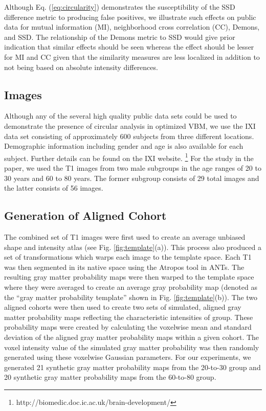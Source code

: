 \documentclass[]{spie}  %
\begin{document}
Although Eq. (\ref{eq:circularity}) demonstrates the susceptibility 
of the SSD difference metric to producing false positives, we illustrate such 
effects on public data for mutual information (MI), neighborhood cross
correlation (CC), Demons, and SSD.  The relationship of the Demons metric
to SSD would give prior indication that similar effects should 
be seen whereas the effect should be lesser for MI and CC given that the
similarity measures are less localized in addition to not being based on
absolute intensity differences.

\subsection{Images}

Although any of the several high quality public data sets could be used to demonstrate the
presence of circular analysis in optimized VBM, we use the IXI data set consisting
of approximately 600 subjects from three different locations.  Demographic
information including gender and age is also available for each subject.  Further
details can be found on the IXI website.%
\footnote{
http://biomedic.doc.ic.ac.uk/brain-development/
}
For the study in the paper, we used the T1 images from two male subgroups in the age
ranges of 20 to 30 years and 60 to 80 years.  The former subgroup consists of 29 total
images and the latter consists of 56 images.  

\subsection{Generation of Aligned Cohort}

The combined set of T1 images were first used to create an average unbiased shape and 
intensity atlas\cite{Avants2010} (see Fig. \ref{fig:template}(a)). This process also produced a set of transformations
which warps each image to the template space.  Each T1 was then segmented in its native
space using the Atropos\cite{Avants2011a} tool in ANTs. The resulting gray matter
probability maps were then warped to the template space where they were averaged
to create an average gray probability map (denoted as the ``gray matter probability
template'' shown in Fig. \ref{fig:template}(b)).   The two aligned cohorts
were then used to create two sets
of  simulated, aligned gray matter probability maps reflecting the characteristic 
intensities of group. These probability maps were created by calculating the voxelwise
mean and standard deviation of the aligned gray matter probability maps within a
given cohort. The voxel intensity value of the simulated gray matter probability was
then randomly generated using these voxelwise Gaussian parameters.  For our
experiments, we generated 21 synthetic gray matter probability maps from the 20-to-30
group and 20 synthetic gray matter probability maps from the 60-to-80 group.
\end{document}
